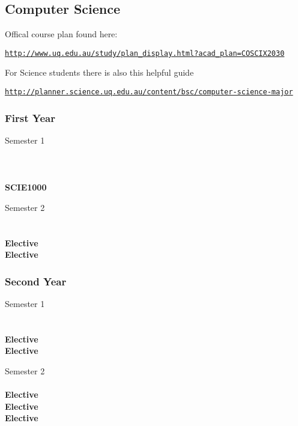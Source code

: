 \subsection{Computer Science}

Offical course plan found here:

\href{http://www.uq.edu.au/study/plan_display.html?acad_plan=COSCIX2030}{\nolinkurl{http://www.uq.edu.au/study/plan_display.html?acad_plan=COSCIX2030}}

For Science students there is also this helpful guide

\href{http://planner.science.uq.edu.au/content/bsc/computer-science-major}{\nolinkurl{http://planner.science.uq.edu.au/content/bsc/computer-science-major}}

\subsubsection{First Year}
\begin{center}
\begin{multicols}{2}
Semester 1 \\
 \\
 \\
 \\
\textbf{SCIE1000} \\
\vfill
\columnbreak

Semester 2 \\
 \\
 \\
\textbf{Elective} \\
\textbf{Elective} \\
\end{multicols}
\end{center}

\subsubsection{Second Year}
\begin{center}
\begin{multicols}{2}
Semester 1 \\
 \\
 \\
\textbf{Elective} \\
\textbf{Elective} \\
\vfill
\columnbreak

Semester 2 \\
 \\
\textbf{Elective} \\
\textbf{Elective} \\
\textbf{Elective} \\
\end{multicols}
\end{center}

